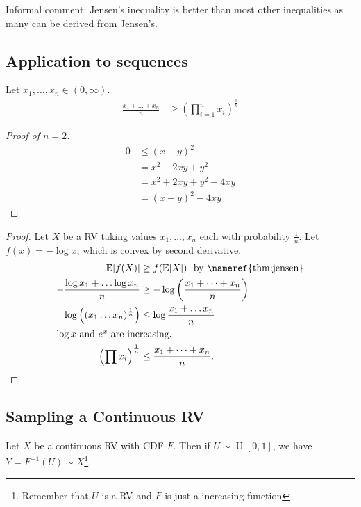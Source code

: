 Informal comment: Jensen's inequality is better than most other inequalities as many can be derived from Jensen's.

\subsection{Application to sequences}
\begin{definition}[AM - GM inequality]
    Let $x_1, \dots, x_n \in (0, \infty)$.
    \begin{align*}
        \frac{x_1 + \dots + x_n}{n} &\geq \left( \prod^n_{i = 1} x_i \right)^{\frac{1}{n}}
    \end{align*} 
\end{definition} 

\begin{proof}[Proof of $n = 2$]
    \begin{align*}
        0 &\leq (x - y)^2  \\
        &= x^2 - 2xy + y^2 \\
        &= x^2 + 2 xy + y^2 - 4xy \\
        &= (x + y)^2 - 4xy
    \end{align*} 
\end{proof} 

\begin{proof}
    Let $X$ be a RV taking values ${x_1, \dots, x_n}$ each with probability $\frac{1}{n}$.
    Let $f(x) = - \log x$, which is convex by second derivative.
    \begin{align*}
        \mathbb{E}[f(X)] &\geq f(\mathbb{E}[X]) \ \text{ by \nameref{thm:jensen}} \\
        - \frac{\log x_1 + \dots \log x_n}{n} &\geq - \log \left( \frac{x_1 + \dots + x_n}{n} \right) \\
        \log \left( (x_1 \dots x_n)^{\frac{1}{n}} \right) &\leq \log \frac{x_1 + \dots x_n}{n} \\
        \intertext{$\log x$ and $e^x$ are increasing.}
        \left( \prod x_i \right)^{\frac{1}{n}} &\leq \frac{x_1 + \dots + x_n}{n}.
    \end{align*} 
\end{proof} 

\subsection{Sampling a Continuous RV}

\begin{theorem}
    Let $X$ be a continuous RV with CDF $F$.
    Then if $U \sim \operatorname{U}[0, 1]$, we have $Y = F^{-1}(U) \sim X$\footnote{Remember that $U$ is a RV and $F$ is just a increasing function}.
\end{theorem} 


